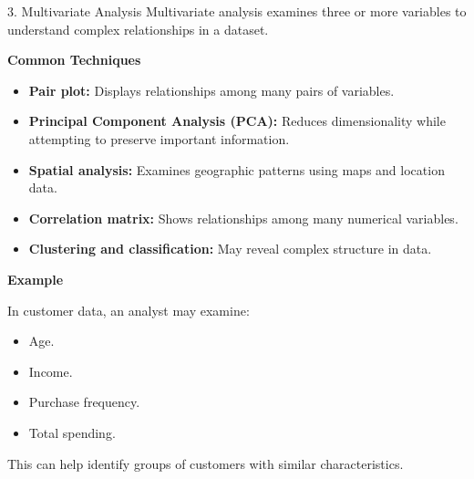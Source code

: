 \documentclass[aspectratio=169,11pt]{beamer}
\begin{document}
\begin{frame}[allowframebreaks]{3. Multivariate Analysis}
\footnotesize
Multivariate analysis examines three or more variables to understand complex relationships in a dataset.\par\medskip
\textbf{Common Techniques}\par\medskip
\begin{itemize}
\item \textbf{Pair plot:} Displays relationships among many pairs of variables.
\item \textbf{Principal Component Analysis (PCA):} Reduces dimensionality while attempting to preserve important information.
\item \textbf{Spatial analysis:} Examines geographic patterns using maps and location data.
\item \textbf{Correlation matrix:} Shows relationships among many numerical variables.
\item \textbf{Clustering and classification:} May reveal complex structure in data.
\end{itemize}
\textbf{Example}\par\medskip
In customer data, an analyst may examine:\par\medskip
\begin{itemize}
\item Age.
\item Income.
\item Purchase frequency.
\item Total spending.
\end{itemize}
This can help identify groups of customers with similar characteristics.\par\medskip
\end{frame}
\end{document}
